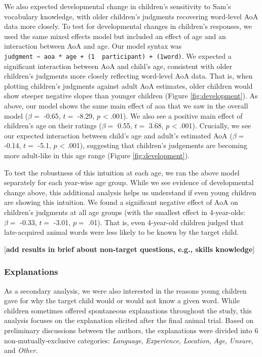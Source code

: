 \documentclass[10pt, letterpaper]{article}
\begin{document}
We also expected developmental change in children's sensitivity to Sam's
vocabulary knowledge, with older children's judgments recovering
word-level AoA data more closely. To test for developmental changes in
children's responses, we used the same mixed effects model but included
an effect of age and an interaction between AoA and age. Our model
syntax was
\texttt{judgment\ \textasciitilde{}\ aoa\ *\ age\ +\ (1\ \textbar{}\ participant)\ +\ (1\textbar{}word)}.
We expected a significant interaction between AoA and child's age,
consistent with older children's judgments more closely reflecting
word-level AoA data. That is, when plotting children's judgments against
adult AoA estimates, older children would show steeper negative slopes
than younger children (Figure \ref{fig:development}). As above, our
model shows the same main effect of aoa that we saw in the overall model
(\(\beta =\) -0.65, \(t =\) -8.29, \(p\) \textless{} .001). We also see
a positive main effect of children's age on their ratings (\(\beta =\)
0.55, \(t =\) 3.68, \(p\) \textless{} .001). Crucially, we see our
expected interaction between child's age and adult's estimated AoA
(\(\beta =\) -0.14, \(t =\) -5.1, \(p\) \textless{} .001), suggesting
that children's judgements are becoming more adult-like in this age
range (Figure \ref{fig:development}).

To test the robustness of this intuition at each age, we ran the above
model separately for each year-wise age group. While we see evidence of
developmental change above, this additional analysis helps us understand
if even young children are showing this intuition. We found a
significant negative effect of AoA on children's judgments at all age
groups (with the smallest effect in 4-year-olds: \(\beta =\) -0.33,
\(t =\) -3.01, \(p =\) .01). That is, even 4-year-old children judged
that late-acquired animal words were less likely to be known by the
target child.

{[}\textbf{add results in brief about non-target questions, e.g., skills
knowledge}{]}

\hypertarget{explanations}{%
\subsubsection{Explanations}\label{explanations}}

As a secondary analysis, we were also interested in the reasons young
children gave for why the target child would or would not know a given
word. While children sometimes offered spontaneous explanations
throughout the study, this analysis focuses on the explanation elicited
after the final animal trial. Based on preliminary discussions between
the authors, the explanations were divided into 6 non-mutually-exclusive
categories: \emph{Language}, \emph{Experience}, \emph{Location},
\emph{Age}, \emph{Unsure}, and \emph{Other}.
\end{document}
